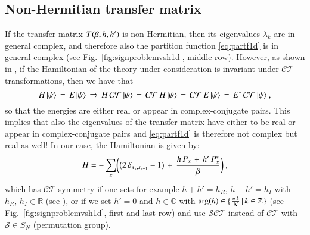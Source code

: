 \documentclass[epj]{webofc}
\let\originalleft\left
\let\originalright\right
\renewcommand{\left}{\mathopen{}\mathclose\bgroup\originalleft}
\renewcommand{\right}{\aftergroup\egroup\originalright}
\newcommand{\of}[1]{\left(#1\right)}
\newcommand{\bof}[1]{\biggl(\bigg.#1\bigg.\biggr)}
\newcommand{\cof}[1]{\left\{\right.#1\left.\right\}}
\newcommand{\ket}[1]{\left| #1\right\rangle}
\renewcommand*\[{\begin{equation}}
\renewcommand*\]{\end{equation}}
\begin{document}
\subsection{Non-Hermitian transfer matrix}\label{ssec:nonhermtransmatrix}
If the transfer matrix $T\of{\beta,h,h'}$ is non-Hermitian, then its eigenvalues $\lambda_{k}$ are in general complex, and therefore also the partition function \eqref{eq:partf1d} is in general complex (see Fig.~\ref{fig:signproblemvsh1d}, middle row). However, as shown in \cite{Meisinger:2010be}, if the Hamiltonian of the theory under consideration is invariant under $\mathcal{CT}$-transformations, then we have that
\[
H\,\ket{\psi}\,=\,E\,\ket{\psi}\,\Rightarrow\,H\,\mathcal{C}\mathcal{T}\,\ket{\psi}\,=\,\mathcal{C}\mathcal{T}\,H\,\ket{\psi}\,=\,\mathcal{C}\mathcal{T}\,E\,\ket{\psi}\,=\,E^{*}\,\mathcal{C}\mathcal{T}\,\ket{\psi}\ ,
\]
so that the energies are either real or appear in complex-conjugate pairs. This implies that also the eigenvalues of the transfer matrix have either to be real or appear in complex-conjugate pairs and \eqref{eq:partf1d} is therefore not complex but real as well! In our case, the Hamiltonian is given by:
\[
H=-\sum\limits_{x}\bof{\of{2\,\delta_{s_{x},s_{x+1}}-1}\,+\,\frac{h\,P_{x}\,+\,h'\,P^{*}_{x}}{\beta}}\ ,\label{eq:pottshamiltonian}
\]
which has $\mathcal{CT}$-symmetry if one sets for example $h+h'=h_{R}$, $h-h'=h_{I}$ with $h_{R},\,h_{I}\in\mathbb{R}$ (see \cite{Meisinger:2010be,Akerlund:2016myr}), or if we set $h'=0$ and $h\in\mathbb{C}$ with $\arg\of{h}\in\cof{\frac{\pi\,k}{N}\,|\,k\in\mathbb{Z}}$ (see Fig.~\ref{fig:signproblemvsh1d}, first and last row) and use $\mathcal{SCT}$ instead of $\mathcal{CT}$ with $\mathcal{S}\in S_{N}$ (permutation group). 
\end{document}
